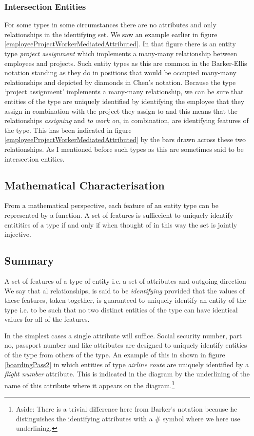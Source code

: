 \subsubsection{Intersection Entities}
\mynote
For some types in some circumstances there are no attributes and only relationships in the identifying set. 
We saw an example earlier
in figure \ref{employeeProjectWorkerMediatedAttributed}. In that figure there
is an entity type
\textit{project assignment} which implements a many-many relationship between employees and projects. 
Such entity types as this are common in the Barker-Ellis notation 
standing as they do in positions that would be occupied many-many relationships
 and depicted by  diamonds in Chen's notation. 
 Because the type `project assignment' implements a many-many relationship, we can be sure that entities of the type  are uniquely identified by 
 identifying the employee that they assign in combination with the project they assign to and this means that the relationships \textit{assigning} and \textit{to work on}, in combination, are identifying features of the type. This has been indicated in 
figure  \ref{employeeProjectWorkerMediatedAttributed} by the bars drawn across these two relationships. As I mentioned before such types as this are sometimes said to be intersection entities.


\subsection {Mathematical Characterisation}
\mynote From a mathematical perspective, 
each feature of an entity type can be represented by a function. A set of features is suffiecient to uniquely identify entitities of a type if and only if when thought  of in this way the set is jointly injective.   



 

\subsection{Summary}
\mynote A set of features of a type of entity i.e. a set of attributes and outgoing direction We say that al relationships, is said to be \textit{identifying} provided that the values of these features,
taken together, is guaranteed to uniquely identify an entity of the type i.e. to be such that no two distinct entities of the type can have identical values for all of the features. 

\mynote In the simplest cases a single attribute will suffice. 
Social security number, part no, 
passport number and like attributes are designed to uniquely identify entities of the type from others of the type. 
An example of this 
in  shown in figure \ref{boardingPass2} in which entities of type \textit{airline route} are uniquely identified by a \textit{flight number} attribute.
This is
indicated in the diagram  by the underlining of the name of this attribute where it appears on the diagram.\footnote{Aside: There is a trivial difference here from Barker's notation because he distinguishes the identifying attributes with a \# symbol where we here use  underlining.} 



